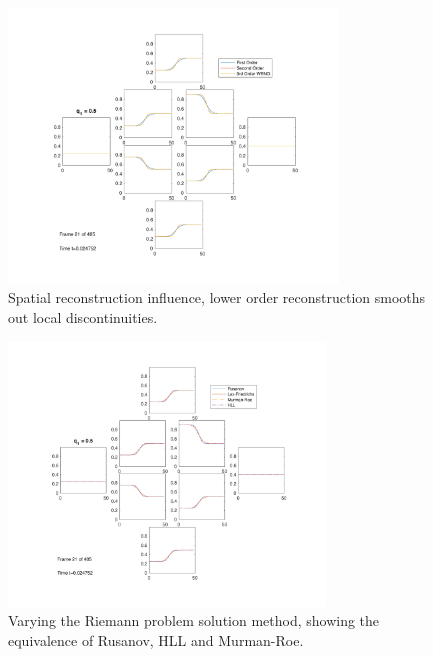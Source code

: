	\begin{figure}
    		\centering
        		\includegraphics[trim=80 50 80 50,clip,width=0.78\textwidth]{trafficCircles1.pdf}
		\caption[Traffic Circles : Reconstruction methods]{Spatial reconstruction influence, lower order reconstruction smooths out local discontinuities.}
		\label{fig:randd:traffic_circles_reco}
	\end{figure}
	\begin{figure}
    		\centering
        		\includegraphics[trim=80 50 80 50,clip,width=0.75\textwidth]{trafficCircles2.pdf}
		\caption[Traffic Circles : Riemann solvers]{Varying the Riemann problem solution method, showing the equivalence of Rusanov, HLL and Murman-Roe.}
		\label{fig:randd:traffic_circles_riemann}
	\end{figure}
